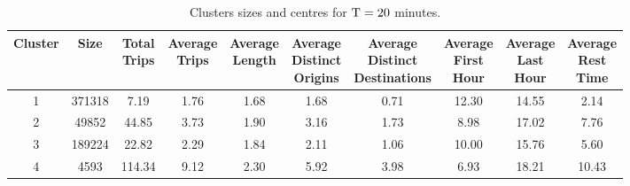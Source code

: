 \begin{table*}[t]
\centering
\small
\begin{tabular}{c c c c c c c c c c}
  \hline
 Cluster &  Size & \thead{Total\\Trips} & \thead{Average\\Trips} & \thead{Average\\Length} & \thead{Average\\Distinct\\Origins} & \thead{Average\\Distinct\\Destinations} & \thead{Average\\First\\Hour} & \thead{Average\\Last\\Hour} & \thead{Average\\Rest\\Time} \\
  \hline
  1 & 371318 & 7.19 & 1.76 & 1.68 & 1.68 & 0.71 & 12.30 & 14.55 & 2.14 \\
    2 & 49852 & 44.85 & 3.73 & 1.90 & 3.16 & 1.73 & 8.98 & 17.02 & 7.76 \\
    3 & 189224 & 22.82 & 2.29 & 1.84 & 2.11 & 1.06 & 10.00 & 15.76 & 5.60 \\
    4 & 4593 & 114.34 & 9.12 & 2.30 & 5.92 & 3.98 & 6.93 & 18.21 & 10.43 \\
   \hline
\end{tabular}
\caption{Clusters sizes and centres for $\mathrm{T} = 20$ minutes.}
\label{t:kmeans_centers_1200}
\end{table*}
